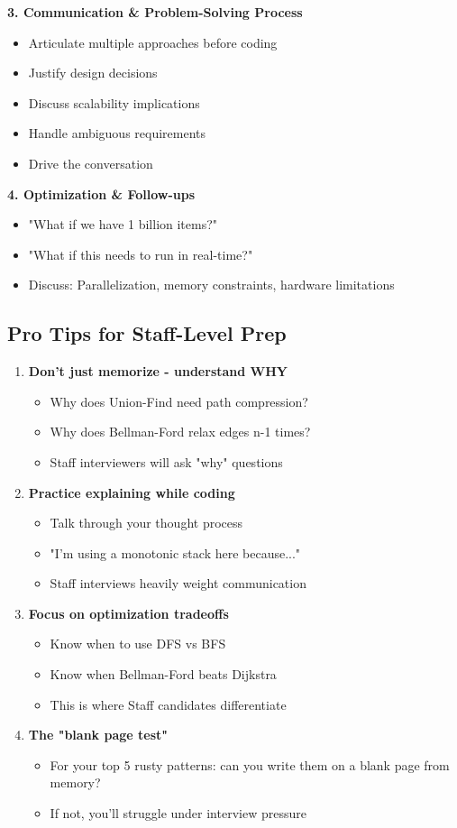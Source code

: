 \documentclass[10pt]{article}
\begin{document}
\textbf{3. Communication \& Problem-Solving Process}
\begin{itemize}
\item Articulate multiple approaches before coding
\item Justify design decisions
\item Discuss scalability implications
\item Handle ambiguous requirements
\item Drive the conversation
\end{itemize}

\textbf{4. Optimization \& Follow-ups}
\begin{itemize}
\item "What if we have 1 billion items?"
\item "What if this needs to run in real-time?"
\item Discuss: Parallelization, memory constraints, hardware limitations
\end{itemize}

\subsection{Pro Tips for Staff-Level Prep}

\begin{enumerate}
\item \textbf{Don't just memorize - understand WHY}
\begin{itemize}
\item Why does Union-Find need path compression?
\item Why does Bellman-Ford relax edges n-1 times?
\item Staff interviewers will ask "why" questions
\end{itemize}

\item \textbf{Practice explaining while coding}
\begin{itemize}
\item Talk through your thought process
\item "I'm using a monotonic stack here because..."
\item Staff interviews heavily weight communication
\end{itemize}

\item \textbf{Focus on optimization tradeoffs}
\begin{itemize}
\item Know when to use DFS vs BFS
\item Know when Bellman-Ford beats Dijkstra
\item This is where Staff candidates differentiate
\end{itemize}

\item \textbf{The "blank page test"}
\begin{itemize}
\item For your top 5 rusty patterns: can you write them on a blank page from memory?
\item If not, you'll struggle under interview pressure
\end{itemize}
\end{enumerate}
\end{document}
